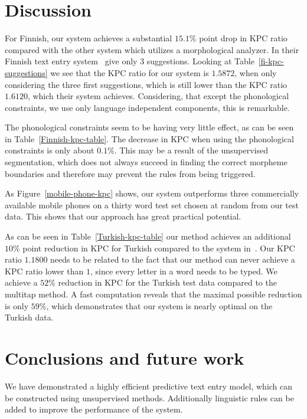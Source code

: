 \documentclass{llncs}
\begin{document}
\section{Discussion}\label{discussion}

For Finnish, our system achieves a substantial $15.1\%$ point drop in KPC
ratio compared with the other system which utilizes a morphological
analyzer. In their Finnish text entry
system~\cite{silfverberg/2011/cla} give only $3$ suggestions. Looking
at Table~\ref{fi-kpc-suggestions} we see that the KPC ratio for our
system is $1.5872$, when only considering the three first suggestions,
which is still lower than the KPC ratio $1.6120$, which their system
achieves. Considering, that except the phonological constraints, we
use only language independent components, this is remarkable.

The phonological constraints seem to be having very little effect, as
can be seen in Table~\ref{Finnish-kpc-table}. The decrease in KPC when
using the phonological constraints is only about $0.1\%$. This may be
a result of the unsupervised segmentation, which does not always
succeed in finding the correct morpheme boundaries and therefore may
prevent the rules from being triggered.

As Figure~\ref{mobile-phone-kpc} shows, our system outperforms three
commercially available mobile phones on a thirty word test set chosen
at random from our test data. This shows that our approach has great
practical potential.

As can be seen in Table~\ref{Turkish-kpc-table} our method achieves an
additional $10\%$ point reduction in KPC for Turkish compared to the
system in~\cite{Tantug:2010}. Our KPC ratio $1.1800$ needs to be
related to the fact that our method can never achieve a KPC ratio
lower than $1$, since every letter in a word needs to be typed. We
achieve a $52\%$ reduction in KPC for the Turkish test data compared
to the multitap method. A fast computation reveals that the maximal
possible reduction is only $59\%$, which demonstrates that our
system is nearly optimal on the Turkish data.

\section{Conclusions and future work}\label{conclusion}

We have demonstrated a highly efficient predictive text entry model,
which can be constructed using unsupervised methods. Additionally
linguistic rules can be added to improve the performance of the
system.
\end{document}
